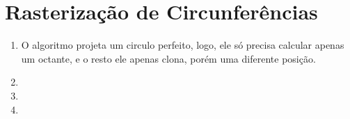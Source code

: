 \section*{Rasterização de Circunferências}

	\begin{enumerate} \addtocounter{enumi}{15}
		\item 
		O algoritmo projeta um circulo perfeito, logo, ele só precisa calcular apenas um
		octante, e o resto ele apenas clona, porém uma diferente posição.
		
		\item 

		\item 

		\item 

	\end{enumerate}
